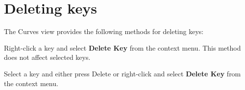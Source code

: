 \chapter{Deleting keys}
\hypertarget{md__hey_tea_9_2_library_2_package_cache_2com_8unity_8timeline_0d1_87_85_2_documentation_0i_2crv__keys__del}{}\label{md__hey_tea_9_2_library_2_package_cache_2com_8unity_8timeline_0d1_87_85_2_documentation_0i_2crv__keys__del}
\label{md__hey_tea_9_2_library_2_package_cache_2com_8unity_8timeline_0d1_87_85_2_documentation_0i_2crv__keys__del_autotoc_md4637}%
%
 The Curves view provides the following methods for deleting keys\+:


\begin{DoxyItemize}
\item Right-\/click a key and select {\bfseries{Delete Key}} from the context menu. This method does not affect selected keys.
\item Select a key and either press Delete or right-\/click and select {\bfseries{Delete Key}} from the context menu. 
\end{DoxyItemize}